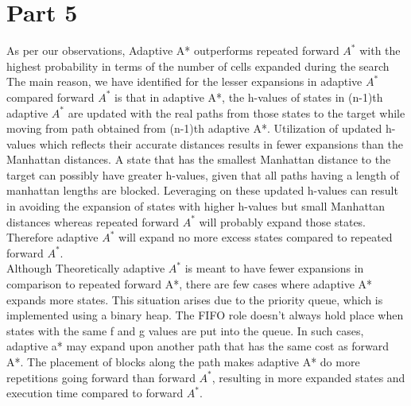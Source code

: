 \documentclass{article}
\begin{document}
\section*{Part 5}
As per our observations, Adaptive A* outperforms repeated forward $A^*$ with the highest probability in terms of the number of cells expanded during the search\\

\noindent The main reason, we have identified for the lesser expansions in adaptive $A^*$ compared forward $A^*$ is that in adaptive A*, the h-values of states in (n-1)th  adaptive $A^*$ are updated with the real paths from those states to the target while moving from path obtained from (n-1)th adaptive A*. Utilization of updated h-values which reflects their accurate distances results in fewer expansions than the Manhattan distances. A state that has the smallest Manhattan distance to the target can possibly have greater h-values, given that all paths having a length of manhattan lengths are blocked. Leveraging on these updated h-values can result in avoiding the expansion of states with higher h-values but small Manhattan distances whereas repeated forward $A^*$ will probably expand those states. Therefore adaptive $A^*$ will expand no more excess states compared to repeated forward $A^*$.\\

\noindent Although Theoretically adaptive $A^*$ is meant to have fewer expansions in comparison to repeated forward A*, there are few cases where adaptive A* expands more states. This situation arises due to the priority queue, which is implemented using a binary heap. The FIFO role doesn’t always hold place when states with the same f and g values are put into the queue. In such cases, adaptive a* may expand upon another path that has the same cost as forward A*. The placement of blocks along the path makes adaptive A* do more repetitions going forward than forward $A^*$, resulting in more expanded states and execution time compared to forward $A^*$.\\ 
\end{document}
